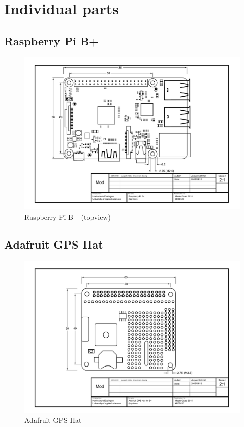 \chapter{Individual parts}
\label{sec:parts}

\section{Raspberry Pi B+}
\label{sec:goals:rpib}
\begin{figure}[H]
    \centering
    \includegraphics[width=\textwidth]{fig/A4_tech_draw_topview_rpi}
    \caption{Raspberry Pi B+ (topview)}
    \label{fig:parts:rpi_topview}
\end{figure}

\newpage
\section{Adafruit GPS Hat}
\label{sec:goals:gpshat}
\begin{figure}[H]
    \centering
    \includegraphics[width=\textwidth]{fig/A4_tech_draw_topview_gpshat}
    \caption{Adafruit GPS Hat}
    \label{fig:parts:gps_topview}
\end{figure}

